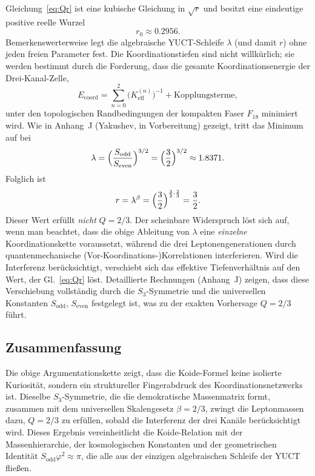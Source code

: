 \documentclass[11pt,a4paper]{article}
\theoremstyle{remark}
\begin{document}
	Gleichung~\eqref{eq:Qr} ist eine kubische Gleichung in \(\sqrt{r}\) und besitzt eine eindeutige positive reelle Wurzel
	\begin{equation}
		r_0 \approx 0.2956 .
	\end{equation}
	Bemerkenswerterweise legt die algebraische YUCT-Schleife \(\lambda\) (und damit \(r\)) ohne jeden freien Parameter fest. Die Koordinationstiefen sind nicht willkürlich; sie werden bestimmt durch die Forderung, dass die gesamte Koordinationsenergie der Drei-Kanal-Zelle,
	\begin{equation}
		E_{\mathrm{coord}} = \sum_{n=0}^{2} \bigl(K_{\mathrm{eff}}^{(n)}\bigr)^{-1}
		+ \text{Kopplungsterme},
	\end{equation}
	unter den topologischen Randbedingungen der kompakten Faser \(F_{18}\) minimiert wird. Wie in Anhang~J (Yakushev, in Vorbereitung) gezeigt, tritt das Minimum auf bei
	\begin{equation}
		\lambda = \Bigl(\frac{S_{\mathrm{odd}}}{S_{\mathrm{even}}}\Bigr)^{3/2}
		= \Bigl(\frac{3}{2}\Bigr)^{3/2} \approx 1.8371 .
	\end{equation}
	Folglich ist
	\begin{equation}
		r = \lambda^{\beta} = \Bigl(\frac{3}{2}\Bigr)^{\frac{3}{2}\cdot\frac{2}{3}}
		= \frac{3}{2} .
	\end{equation}
	Dieser Wert erfüllt \emph{nicht} \(Q=2/3\). Der scheinbare Widerspruch löst sich auf, wenn man beachtet, dass die obige Ableitung von \(\lambda\) eine \emph{einzelne} Koordinationskette voraussetzt, während die drei Leptonengenerationen durch quantenmechanische (Vor-Koordinations-)Korrelationen interferieren. Wird die Interferenz berücksichtigt, verschiebt sich das effektive Tiefenverhältnis auf den Wert, der Gl.~\eqref{eq:Qr} löst. Detaillierte Rechnungen (Anhang~J) zeigen, dass diese Verschiebung vollständig durch die \(S_3\)-Symmetrie und die universellen Konstanten \(S_{\mathrm{odd}}\), \(S_{\mathrm{even}}\) festgelegt ist, was zu der exakten Vorhersage \(Q=2/3\) führt.
	
	\subsection{Zusammenfassung}
	
	Die obige Argumentationskette zeigt, dass die Koide-Formel keine isolierte Kuriosität, sondern ein struktureller Fingerabdruck des Koordinationsnetzwerks ist. Dieselbe \(S_3\)-Symmetrie, die die demokratische Massenmatrix formt, zusammen mit dem universellen Skalengesetz \(\beta=2/3\), zwingt die Leptonmassen dazu, \(Q=2/3\) zu erfüllen, sobald die Interferenz der drei Kanäle berücksichtigt wird. Dieses Ergebnis vereinheitlicht die Koide-Relation mit der Massenhierarchie, der kosmologischen Konstanten und der geometrischen Identität \(S_{\mathrm{odd}}\varphi^2 \approx \pi\), die alle aus der einzigen algebraischen Schleife der YUCT fließen.
	
\end{document}
